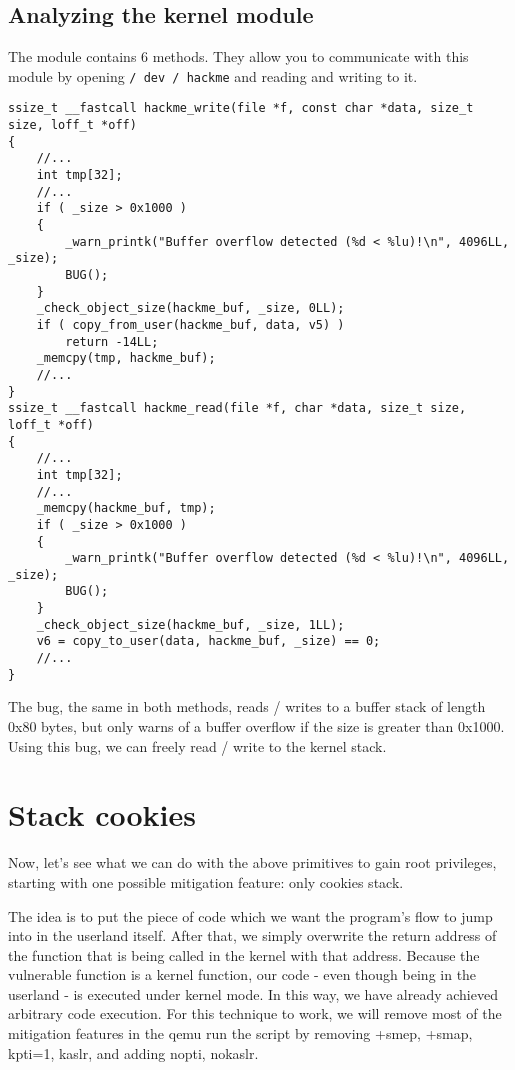 \documentclass{masterthesis}
\begin{document}
\subsection{Analyzing the kernel module}
\label{subch:hackme}
The module contains 6 methods.
They allow you to communicate with this module by opening \lstinline{/ dev / hackme} and reading and writing to it.
\begin{lstlisting}
ssize_t __fastcall hackme_write(file *f, const char *data, size_t size, loff_t *off)
{   
    //...
    int tmp[32];
    //...
    if ( _size > 0x1000 )
    {
        _warn_printk("Buffer overflow detected (%d < %lu)!\n", 4096LL, _size);
        BUG();
    }
    _check_object_size(hackme_buf, _size, 0LL);
    if ( copy_from_user(hackme_buf, data, v5) )
        return -14LL;
    _memcpy(tmp, hackme_buf);
    //...
}
ssize_t __fastcall hackme_read(file *f, char *data, size_t size, loff_t *off)
{   
    //...
    int tmp[32];
    //...
    _memcpy(hackme_buf, tmp);
    if ( _size > 0x1000 )
    {
        _warn_printk("Buffer overflow detected (%d < %lu)!\n", 4096LL, _size);
        BUG();
    }
    _check_object_size(hackme_buf, _size, 1LL);
    v6 = copy_to_user(data, hackme_buf, _size) == 0;
    //...
}
\end{lstlisting}
The bug, the same in both methods, reads / writes to a buffer stack of length 0x80 bytes, but only warns of a buffer overflow if the size is greater than 0x1000. Using this bug, we can freely read / write to the kernel stack.

\section{Stack cookies}
Now, let's see what we can do with the above primitives to gain root privileges, starting with one possible mitigation feature: only cookies stack.

The idea is to put the piece of code which we want the program’s flow to jump into in the userland itself. After that, we simply overwrite the return address of the function that is being called in the kernel with that address. Because the vulnerable function is a kernel function, our code - even though being in the userland - is executed under kernel mode. In this way, we have already achieved arbitrary code execution.
For this technique to work, we will remove most of the mitigation features in the qemu run the script by removing +smep, +smap, kpti=1, kaslr, and adding nopti, nokaslr.
\end{document}
